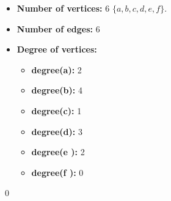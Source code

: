 \documentclass[12pt]{article}
\begin{document}
  \begin{itemize}
  \item \textbf{Number of vertices:} 6 $\{a,b,c,d,e,f\}$.
  \item \textbf{Number of edges:} 6
  \item \textbf{Degree of vertices:} 
    \begin{itemize}
    \item \textbf{degree(a):} 2
    \item \textbf{degree(b):} 4
    \item \textbf{degree(c):} 1
    \item \textbf{degree(d):} 3
    \item \textbf{degree(e ):} 2
    \item \textbf{degree(f ):} 0
    \end{itemize}
  \end{itemize}
  \qed
\end{document}
